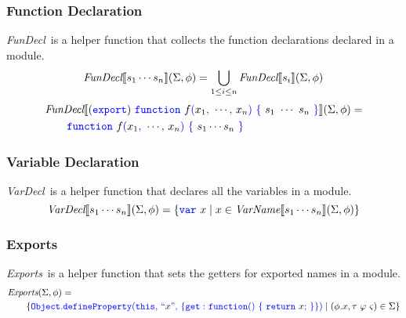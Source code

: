 \documentclass[a4paper]{article}
\newcommand{\code}[1]{\textcolor{blue}{\tt #1}}
\newcommand{\VarName}{\emph{VarName}}
\newcommand{\FunDecl}{\emph{FunDecl}}
\newcommand{\VarDecl}{\emph{VarDecl}}
\newcommand{\Exports}{\emph{Exports}}
\begin{document}
\subsubsection{Function Declaration}
\FunDecl\ is a helper function that collects the function declarations declared in a module.
\begin{equation*}
\FunDecl \llbracket s_1 \cdots s_n \rrbracket (\Sigma, \phi) = \bigcup_{1 \le i \le n} \FunDecl \llbracket s_i \rrbracket (\Sigma, \phi)
\end{equation*}
\begin{equation*}
\begin{split}
&\FunDecl \llbracket (\code{export})\ \code{function}\ f\code{(}x_1\code{,}\ \cdots\code{,}\ x_n\code{)}\ \code{\{}\ s_1\ \cdots\ s_n\ \code{\}} \rrbracket (\Sigma, \phi) = \\
&\qquad \code{function}\ f\code{(}x_1\code{,}\ \cdots\code{,}\ x_n\code{)}\ \code{\{}\ s_1 \cdots s_n\ \code{\}}
\end{split}
\end{equation*}

\subsubsection{Variable Declaration}
\VarDecl\ is a helper function that declares all the variables in a module.
\begin{equation*}
\VarDecl \llbracket s_1 \cdots s_n \rrbracket (\Sigma, \phi) = \{ \code{var}\ x \mid x \in \VarName \llbracket s_1 \cdots s_n \rrbracket (\Sigma, \phi) \}
\end{equation*}

\subsubsection{Exports}
\Exports\ is a helper function that sets the getters for exported names in a module.
\begin{equation*}
\begin{split}
&\Exports (\Sigma, \phi) = \\
&\qquad \{ \code{Object.defineProperty(this,}\ \code{``}x\code{",}\ \code{\{get:}\ \code{function()}\ \code{\{}\ \code{return}\ x\code{;}\ \code{\}\})} \mid (\phi.x, \tau\ \varphi\ \varsigma) \in \Sigma \}
\end{split}
\end{equation*}
\end{document}

